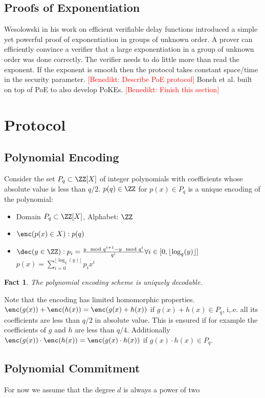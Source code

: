 \documentclass{article}
\newtheorem{fact}{Fact}
\newcommand{\benedikt}[1]{{\textcolor{red}{[Benedikt: #1]}}}
\newcommand{\benedikt}[1]{}
\begin{document}
\subsection{Proofs of Exponentiation}
Wesolowski \cite{EC:Wesolowski19} in his work on efficient verifiable delay functions introduced a simple yet powerful proof of exponentiation in groups of unknown order. A prover can efficiently convince a verifier that a large exponentiation in a group of unknown order was done correctly. The verifier needs to do little more than read the exponent. If the exponent is smooth then the protocol takes constant space/time in the security parameter.
\benedikt{Describe PoE protocol}
Boneh et al. \cite{journals/iacr/BonehBF18a} built on top of PoE to also develop PoKEs. \benedikt{Finish this section}
\section{Protocol}
\label{sec:protocol}

\subsection{Polynomial Encoding}

	Consider the set $P_q\subset \ZZ[X]$ of integer polynomials with coefficients whose absolute value is less than $q/2$. $p(q) \in \ZZ$ for $p(x)\in P_q$ is a unique encoding of the polynomial:
\begin{itemize}
	\item Domain $P_q \subset \ZZ[X]$, Alphabet: $\ZZ$
	\item $\enc(p(x) \in X): p(q)$
	\item $\dec(y \in \ZZ): p_i=\frac{y \mod q^{i+1}-y \mod q^{i}}{q^i} \forall i \in [0,\lfloor\log_q(y)\rfloor]$\\
	$p(x)=\sum_{i=0}^{\lfloor\log_q(y)\rfloor} p_i x^i$
\end{itemize}

\begin{fact}
	The polynomial encoding scheme is uniquely decodable.
\end{fact}

Note that the encoding has limited homomorphic properties. $\enc(g(x))+\enc(h(x))=\enc(g(x)+h(x))$ if $g(x)+h(x)\in P_q$, i,.e. all its coefficients are less than $q/2$ in absolute value. This is ensured if for example the coefficients of $g$ and $h$ are less than $q/4$. Additionally $\enc(g(x))\cdot \enc(h(x))=\enc(g(x)\cdot h(x))$ if $g(x)\cdot h(x)\in P_q$.
\subsection{Polynomial Commitment}
 For now we assume that the degree $d$ is always a power of two
\end{document}
